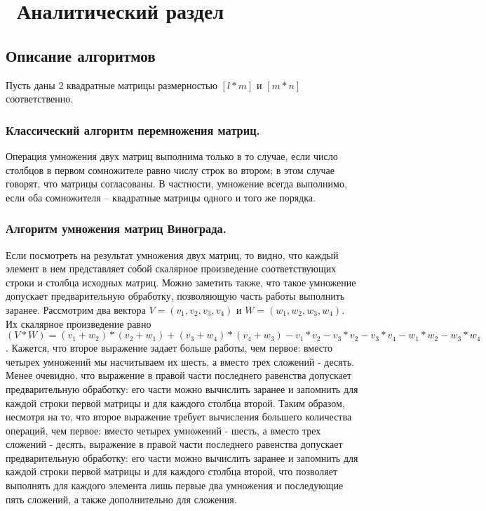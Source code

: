 \chapter{ Аналитический раздел}
\label{cha:analysis}

\section{ Описание алгоритмов}
Пусть даны 2 квадратные матрицы размерностью $[l * m]$ и $[m * n]$ соответственно.

\subsection{ Классический алгоритм перемножения матриц.}
Операция умножения двух матриц выполнима только в то случае, если число столбцов в первом сомножителе равно числу строк во втором; в этом случае говорят, что матрицы согласованы. В частности, умножение всегда выполнимо, если оба сомножителя -- квадратные матрицы одного и того же порядка.

\subsection{ Алгоритм умножения матриц Винограда.}
Если посмотреть на результат умножения двух матриц, то видно, что каждый элемент в нем представляет собой скалярное произведение соответствующих строки и столбца исходных матриц. Можно заметить также, что такое умножение допускает предварительную обработку, позволяющую часть работы выполнить заранее. Рассмотрим два вектора $V = (v_1, v_2, v_3, v_4)$ и $W = (w_1, w_2, w_3, w_4)$. Их скалярное произведение равно $(V*W) = (v_1+w_2)*(v_2+w_1)+(v_3+w_4)*(v_4+w_3) - v_1*v_2 - v_3*v_2 - v_3*v_4-w_1*w_2-w_3*w_4$. Кажется, что второе выражение задает больше работы, чем первое: вместо четырех умножений мы насчитываем их шесть, а вместо трех сложений - десять. Менее очевидно, что выражение в правой части последнего равенства допускает предварительную обработку: его части можно вычислить заранее и запомнить для каждой строки первой матрицы и для каждого столбца второй. Таким образом, несмотря на то, что второе выражение требует вычисления большего количества операций, чем первое: вместо четырех умножений - шесть, а вместо трех сложений - десять, выражение в правой части последнего равенства допускает предварительную обработку: его части можно вычислить заранее и запомнить для каждой строки первой матрицы и для каждого столбца второй, что позволяет выполнять для каждого элемента лишь первые два умножения и последующие пять сложений, а также дополнительно для сложения.

